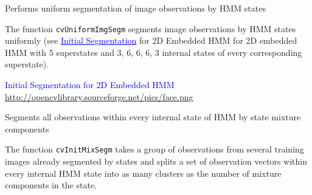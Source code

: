 {


Performs uniform segmentation of image observations by HMM states


\begin{description}
\end{description}

The function \texttt{cvUniformImgSegm} segments image observations by HMM states uniformly (see \textcolor{blue}{\underline{Initial Segmentation}} for 2D Embedded HMM for 2D embedded HMM with 5 superstates and 3, 6, 6, 6, 3 internal states of every corresponding superstate).

\textcolor{blue}{Initial Segmentation for 2D Embedded HMM}
\newline
\url{http://opencvlibrary.sourceforge.net/pics/face.png}


Segments all observations within every internal state of HMM by state mixture components


\begin{description}
\end{description}

The function \texttt{cvInitMixSegm} takes a group of observations from several training images already segmented by states and splits a set of observation vectors within every internal HMM state into as many clusters as the number of mixture components in the state.


}
